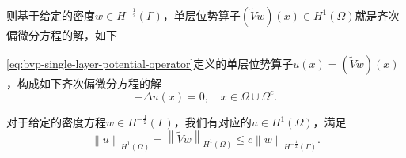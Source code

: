 则基于给定的密度$w \in H^{-\frac{1}{2}}(\Gamma)$，单层位势算子$\left( \widetilde{V} w \right) (x) \in H^{1}(\Omega)$就是齐次偏微分方程的解，如下
\begin{lemma}
  \label{lemma:bvp-single-layer-potential-operator}
  \eqref{eq:bvp-single-layer-potential-operator}定义的单层位势算子$u(x)=\left( \widetilde{V} w \right) (x)$，构成如下齐次偏微分方程的解
  \begin{equation*}
    - \Delta u(x) = 0, \quad x \in \Omega \cup \Omega^{c}.
  \end{equation*}

  对于给定的密度方程$w \in H^{- \frac{1}{2}}(\Gamma)$，我们有对应的$u \in H^{1}(\Omega)$，满足
  \begin{equation}
    \label{eq:bvp-single-layer-potential-definition}
    \left\| u \right\|_{H^{1}(\Omega)} = \left\| \widetilde{V} w \right\|_{H^{1}(\Omega)} \le c \left\| w \right\|_{H^{-\frac{1}{2}}(\Gamma)}.
  \end{equation}
\end{lemma}
